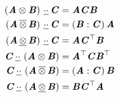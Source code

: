 \begin{align}
  \lowerdoubledotprod{\pbrac{\tensorprod{\tensortwo{A}}{\tensortwo{B}}}}{\tensortwo{C}}&=\tensortwo{A}\tensortwo{C}\tensortwo{B}\\
  \lowerdoubledotprod{\pbrac{\uppertensorprod{\tensortwo{A}}{\tensortwo{B}}}}{\tensortwo{C}}&=\pbrac{\doubledotprod{\tensortwo{B}}{\tensortwo{C}}}\tensortwo{A}\\
  \lowerdoubledotprod{\pbrac{\lowertensorprod{\tensortwo{A}}{\tensortwo{B}}}}{\tensortwo{C}}&=\tensortwo{A}\transpose{\tensortwo{C}}\tensortwo{B}\\
  \lowerdoubledotprod{\tensortwo{C}}{\pbrac{\tensorprod{\tensortwo{A}}{\tensortwo{B}}}}&=\transpose{\tensortwo{A}}\tensortwo{C}\transpose{\tensortwo{B}}\\
  \lowerdoubledotprod{\tensortwo{C}}{\pbrac{\uppertensorprod{\tensortwo{A}}{\tensortwo{B}}}}&=\pbrac{\doubledotprod{\tensortwo{A}}{\tensortwo{C}}}\tensortwo{B}\\
  \lowerdoubledotprod{\tensortwo{C}}{\pbrac{\lowertensorprod{\tensortwo{A}}{\tensortwo{B}}}}&=\tensortwo{B}\transpose{\tensortwo{C}}\tensortwo{A}
\end{align}

